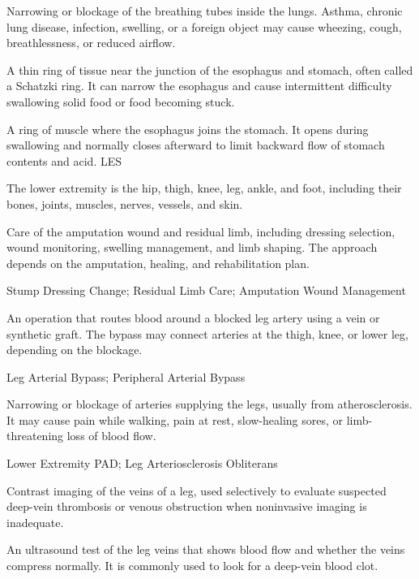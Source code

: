 Narrowing or blockage of the breathing tubes inside the lungs. Asthma, chronic lung disease, infection, swelling, or a foreign object may cause wheezing, cough, breathlessness, or reduced airflow.

 A thin ring of tissue near the junction of the esophagus and stomach, often called a Schatzki ring. It can narrow the esophagus and cause intermittent difficulty swallowing solid food or food becoming stuck.

 A ring of muscle where the esophagus joins the stomach. It opens during swallowing and normally closes afterward to limit backward flow of stomach contents and acid.
\synonyms
LES

 The lower extremity is the hip, thigh, knee, leg, ankle, and foot, including their bones, joints, muscles, nerves, vessels, and skin.

 Care of the amputation wound and residual limb, including dressing selection, wound monitoring, swelling management, and limb shaping. The approach depends on the amputation, healing, and rehabilitation plan.

\synonyms
Stump Dressing Change; Residual Limb Care; Amputation Wound Management

 An operation that routes blood around a blocked leg artery using a vein or synthetic graft. The bypass may connect arteries at the thigh, knee, or lower leg, depending on the blockage.

\synonyms
Leg Arterial Bypass; Peripheral Arterial Bypass

 Narrowing or blockage of arteries supplying the legs, usually from atherosclerosis. It may cause pain while walking, pain at rest, slow-healing sores, or limb-threatening loss of blood flow.

\synonyms
Lower Extremity PAD; Leg Arteriosclerosis Obliterans

 Contrast imaging of the veins of a leg, used selectively to evaluate suspected deep-vein thrombosis or venous obstruction when noninvasive imaging is inadequate.

 An ultrasound test of the leg veins that shows blood flow and whether the veins compress normally. It is commonly used to look for a deep-vein blood clot.

